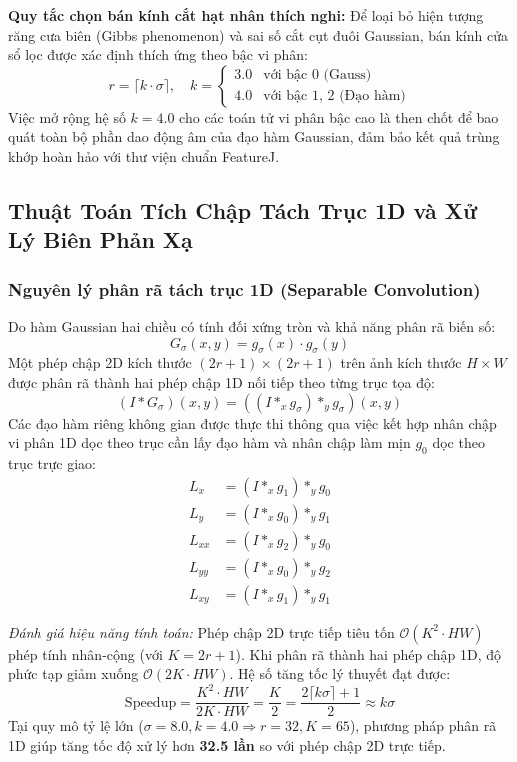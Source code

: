 \textbf{Quy tắc chọn bán kính cắt hạt nhân thích nghi:} Để loại bỏ hiện tượng răng cưa biên (Gibbs phenomenon) và sai số cắt cụt đuôi Gaussian, bán kính cửa sổ lọc được xác định thích ứng theo bậc vi phân:
\begin{equation}
r = \lceil k \cdot \sigma \rceil, \quad k = \begin{cases} 3.0 & \text{với bậc 0 (Gauss)} \\ 4.0 & \text{với bậc 1, 2 (Đạo hàm)} \end{cases}
\end{equation}
Việc mở rộng hệ số $k=4.0$ cho các toán tử vi phân bậc cao là then chốt để bao quát toàn bộ phần dao động âm của đạo hàm Gaussian, đảm bảo kết quả trùng khớp hoàn hảo với thư viện chuẩn FeatureJ.

\subsection{Thuật Toán Tích Chập Tách Trục 1D và Xử Lý Biên Phản Xạ}
\subsubsection{Nguyên lý phân rã tách trục 1D (Separable Convolution)}
Do hàm Gaussian hai chiều có tính đối xứng tròn và khả năng phân rã biến số:
\begin{equation}
G_\sigma(x, y) = g_\sigma(x) \cdot g_\sigma(y)
\end{equation}
Một phép chập 2D kích thước $(2r+1) \times (2r+1)$ trên ảnh kích thước $H \times W$ được phân rã thành hai phép chập 1D nối tiếp theo từng trục tọa độ:
\begin{equation}
(I * G_\sigma)(x, y) = \left( (I *_x g_\sigma) *_y g_\sigma \right)(x, y)
\end{equation}
Các đạo hàm riêng không gian được thực thi thông qua việc kết hợp nhân chập vi phân 1D dọc theo trục cần lấy đạo hàm và nhân chập làm mịn $g_0$ dọc theo trục trực giao:
\begin{align}
L_x &= (I *_x g_1) *_y g_0 \label{eq:lx} \\
L_y &= (I *_x g_0) *_y g_1 \label{eq:ly} \\
L_{xx} &= (I *_x g_2) *_y g_0 \label{eq:lxx} \\
L_{yy} &= (I *_x g_0) *_y g_2 \label{eq:lyy} \\
L_{xy} &= (I *_x g_1) *_y g_1 \label{eq:lxy}
\end{align}

\textit{Đánh giá hiệu năng tính toán:} Phép chập 2D trực tiếp tiêu tốn $\mathcal{O}(K^2 \cdot HW)$ phép tính nhân-cộng (với $K = 2r+1$). Khi phân rã thành hai phép chập 1D, độ phức tạp giảm xuống $\mathcal{O}(2K \cdot HW)$. Hệ số tăng tốc lý thuyết đạt được:
\begin{equation}
\text{Speedup} = \frac{K^2 \cdot HW}{2K \cdot HW} = \frac{K}{2} = \frac{2\lceil k\sigma \rceil + 1}{2} \approx k\sigma
\end{equation}
Tại quy mô tỷ lệ lớn ($\sigma = 8.0, k = 4.0 \Rightarrow r = 32, K = 65$), phương pháp phân rã 1D giúp tăng tốc độ xử lý hơn \textbf{32.5 lần} so với phép chập 2D trực tiếp.

